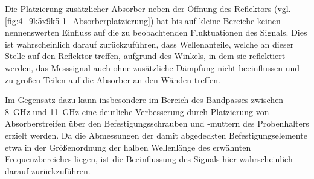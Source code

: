 Die Platzierung zusätzlicher Absorber neben der Öffnung des Reflektors (vgl. \Abb\ref{fig:4_9k5x9k5-1_Absorberplatzierung}) hat bis auf kleine Bereiche keinen nennenswerten Einfluss auf die zu beobachtenden Fluktuationen des Signals. Dies ist wahrscheinlich darauf zurückzuführen, dass Wellenanteile, welche an dieser Stelle auf den Reflektor treffen, aufgrund des Winkels, in dem sie reflektiert werden, das Messsignal auch ohne zusätzliche Dämpfung nicht beeinflussen und zu großen Teilen auf die Absorber an den Wänden treffen.
\par
\vspace{\linespace}
Im Gegensatz dazu kann insbesondere im Bereich des Bandpasses zwischen \SI{8}{\giga\hertz} und  \SI{11}{\giga\hertz} eine deutliche Verbesserung durch Platzierung von Absorberstreifen über den Befestigungsschrauben und -muttern des Probenhalters erzielt werden. Da die Abmessungen der damit abgedeckten Befestigungselemente etwa in der Größenordnung der halben Wellenlänge des erwähnten Frequenzbereiches liegen, ist die Beeinflussung des Signals hier wahrscheinlich darauf zurückzuführen. 
\par
\vspace{\linespace}

